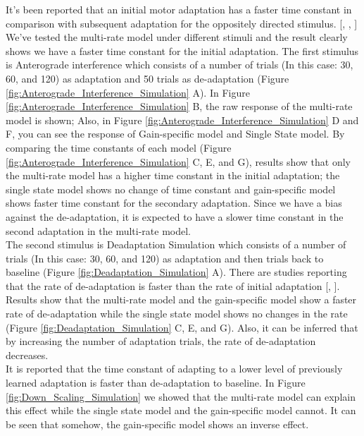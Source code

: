 \documentclass[9pt,twocolumn]{paper-template}
\begin{document}
It’s been reported that an initial motor adaptation has a faster time constant in comparison with subsequent adaptation for the oppositely directed stimulus. [\cite{Bizzi}, \cite{shadmehr_jn}, \cite{Wolpert}] We’ve tested the multi-rate model under different stimuli and the result clearly shows we have a faster time constant for the initial adaptation. 
The first stimulus is Anterograde interference which consists of a number of trials (In this case: 30, 60, and 120) as adaptation and 50 trials as de-adaptation (Figure \ref{fig:Anterograde_Interference_Simulation} A). In Figure \ref{fig:Anterograde_Interference_Simulation} B, the raw response of the multi-rate model is shown; Also, in Figure \ref{fig:Anterograde_Interference_Simulation} D and F, you can see the response of Gain-specific model and Single State model. By comparing the time constants of each model (Figure \ref{fig:Anterograde_Interference_Simulation} C, E, and G), results show that only the multi-rate model has a higher time constant in the initial adaptation; the single state model shows no change of time constant and gain-specific model shows faster time constant for the secondary adaptation. Since we have a bias against the de-adaptation, it is expected to have a slower time constant in the second adaptation in the multi-rate model.\\




The second stimulus is Deadaptation Simulation which consists of a number of trials (In this case: 30, 60, and 120) as adaptation and then trials back to baseline (Figure \ref{fig:Deadaptation_Simulation} A). There are studies reporting that the rate of de-adaptation is faster than the rate of initial adaptation [\cite{Wolpert}, \cite{shadmehr_jnp}]. Results show that the multi-rate model and the gain-specific model show a faster rate of de-adaptation while the single state model shows no changes in the rate (Figure \ref{fig:Deadaptation_Simulation} C, E, and G). Also, it can be inferred that by increasing the number of adaptation trials, the rate of de-adaptation decreases.\\


It is reported that the time constant of adapting to a lower level of previously learned adaptation is faster than de-adaptation to baseline. In Figure \ref{fig:Down_Scaling_Simulation} we showed that the multi-rate model can explain this effect while the single state model and the gain-specific model cannot. It can be seen that somehow, the gain-specific model shows an inverse effect.\\
\end{document}
